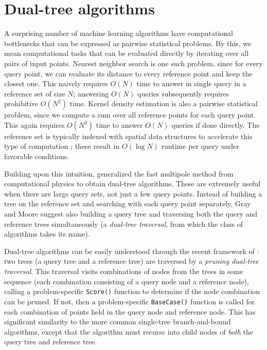 \documentclass[twoside,11pt]{article} %
\begin{document}
\section{Dual-tree algorithms}

A surprising number of machine learning algorithms have computational
bottlenecks that can be expressed as pairwise statistical problems. 
By this, we mean computational tasks that can be evaluated directly by iterating over all 
pairs of input points. 
Nearest neighbor search is one such problem, since for every query point, we can 
evaluate its distance to every reference point and keep the closest one. 
This naively requires $O(N)$ time
to answer in single query in a reference set of size $N$; answering $O(N)$
queries subsequently requires prohibitive $O(N^2)$ time. Kernel density
estimation is also a pairwise statistical problem, since we compute a sum over all 
reference points for each query point.
This again requires $O(N^2)$
time to answer $O(N)$ queries if done directly. 
The reference set is typically indexed with
spatial data structures to accelerate this type of computation
\citep{finkel1974quad, langford2006}; these result in $O(\log N)$ runtime per
query under favorable conditions.

Building upon this intuition, \citet{nbody} generalized the fast multipole
method from computational physics to obtain dual-tree algorithms.  These are
extremely useful when there are large query sets, not just a few query points.
Instead of building a tree on the reference set and searching with each query
point separately, Gray and Moore suggest also building a query tree and
traversing both the query and reference trees simultaneously (a {\it dual-tree
traversal}, from which the class of algorithms takes its name).

Dual-tree algorithms can be easily understood through the recent framework of
\citet{curtin2013tree}: two trees (a query tree and a reference
tree) are traversed by a {\it pruning dual-tree traversal}.  This traversal
visits combinations of nodes from the trees in some sequence (each combination
consisting of a query node and a reference node), calling a problem-specific
\texttt{Score()} function to determine if the node combination can be pruned.
If not, then a problem-specific \texttt{BaseCase()} function is called for each
combination of points held in the query node and reference node.  This has
significant similarity to the more common single-tree branch-and-bound
algorithms, except that the algorithm must recurse into child nodes of {\it
both} the query tree and reference tree.
\end{document}
